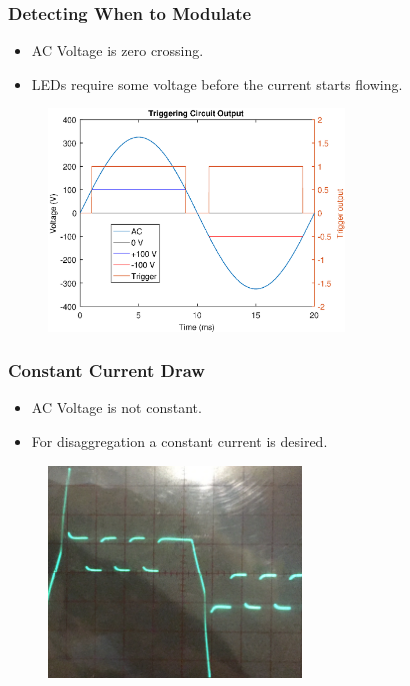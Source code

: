 \documentclass{beamer}
\begin{document}
	\begin{frame}\frametitle{Detecting When to Modulate}
		\begin{itemize}
			\item AC Voltage is zero crossing.
			\item LEDs require some voltage before the current starts flowing.
		\end{itemize}
		
		\begin{figure}
			\centering
			\includegraphics[width=0.7\textwidth]{ac-wave-triggering.eps}
		\end{figure}
		
	\end{frame}




	\begin{frame}\frametitle{Constant Current Draw}
		\begin{itemize}
			\item AC Voltage is not constant.
			\item For disaggregation a constant current is desired.
		\end{itemize}
		\begin{figure}
			\centering
			\includegraphics[width=0.6\textwidth]{../chapters/hardware-chapters/AC/ac-modulator/custom-hardware/ac-current-source/current-source-measurement-cropped.png}
		\end{figure}


	\end{frame}
\end{document}
